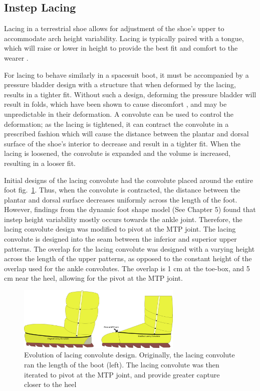 \documentclass[defaultstyle,11pt]{comps}
\begin{document}
\hypertarget{instep-lacing}{%
\subsection{Instep Lacing}\label{instep-lacing}}

Lacing in a terrestrial shoe allows for adjustment of the shoe's upper to accommodate arch height variability.
Lacing is typically paired with a tongue, which will raise or lower in height to provide the best fit and comfort to the wearer \citep{Feeney2019}.

For lacing to behave similarly in a spacesuit boot, it must be accompanied by a pressure bladder design with a structure that when deformed by the lacing, results in a tighter fit.
Without such a design, deforming the pressure bladder will result in folds, which have been shown to cause discomfort \citep{Chappell2017}, and may be unpredictable in their deformation.
A convolute can be used to control the deformation; as the lacing is tightened, it can contract the convolute in a prescribed fashion which will cause the distance between the plantar and dorsal surface of the shoe's interior to decrease and result in a tighter fit.
When the lacing is loosened, the convolute is expanded and the volume is increased, resulting in a looser fit.

Initial designs of the lacing convolute had the convolute placed around the entire foot fig.~\ref{fig:SA3-lacingevo}.
Thus, when the convolute is contracted, the distance between the plantar and dorsal surface decreases uniformly across the length of the foot.
However, findings from the dynamic foot shape model (See Chapter 5) found that instep height variability mostly occurs towards the ankle joint.
Therefore, the lacing convolute design was modified to pivot at the MTP joint.
The lacing convolute is designed into the seam between the inferior and superior upper patterns.
The overlap for the lacing convolute was designed with a varying height across the length of the upper patterns, as opposed to the constant height of the overlap used for the ankle convolutes.
The overlap is 1 cm at the toe-box, and 5 cm near the heel, allowing for the pivot at the MTP joint.

\begin{figure}
\hypertarget{fig:SA3-lacingevo}{%
\centering
\includegraphics[width=0.7\textwidth,height=\textheight]{../fig/SA3/LacingConvolute_evolution.png}
\caption{Evolution of lacing convolute design. Originally, the lacing convolute ran the length of the boot (left). The lacing convolute was then iterated to pivot at the MTP joint, and provide greater capture closer to the heel}\label{fig:SA3-lacingevo}
}
\end{figure}
\end{document}
